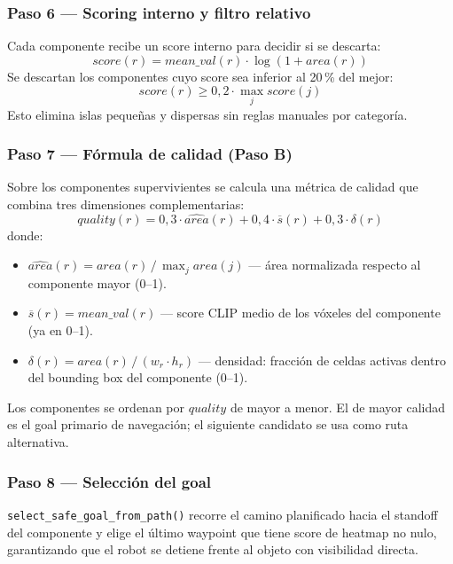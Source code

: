 \documentclass[11pt,a4paper]{article}
\begin{document}
\subsubsection*{Paso 6 — Scoring interno y filtro relativo}

Cada componente recibe un score interno para decidir si se descarta:
\[
  \textit{score}(r) = \textit{mean\_val}(r) \cdot \log(1 + \textit{area}(r))
\]
Se descartan los componentes cuyo score sea inferior al 20\,\% del mejor:
\[
  \textit{score}(r) \geq 0{,}2 \cdot \max_j \textit{score}(j)
\]
Esto elimina islas pequeñas y dispersas sin reglas manuales por categoría.

\subsubsection*{Paso 7 — Fórmula de calidad (Paso B)}

Sobre los componentes supervivientes se calcula una métrica de calidad que combina
tres dimensiones complementarias:
\[
  \textit{quality}(r) = 0{,}3 \cdot \widehat{\textit{area}}(r)
                      + 0{,}4 \cdot \overline{s}(r)
                      + 0{,}3 \cdot \delta(r)
\]
donde:
\begin{itemize}
  \item $\widehat{\textit{area}}(r) = \textit{area}(r) \,/\, \max_j \textit{area}(j)$
        --- área normalizada respecto al componente mayor (0--1).
  \item $\overline{s}(r) = \textit{mean\_val}(r)$ --- score CLIP medio de los vóxeles
        del componente (ya en 0--1).
  \item $\delta(r) = \textit{area}(r) \,/\, (w_r \cdot h_r)$ --- densidad: fracción de
        celdas activas dentro del bounding box del componente (0--1).
\end{itemize}
Los componentes se ordenan por $\textit{quality}$ de mayor a menor. El de mayor calidad
es el goal primario de navegación; el siguiente candidato se usa como ruta alternativa.

\subsubsection*{Paso 8 — Selección del goal}

\texttt{select\_safe\_goal\_from\_path()} recorre el camino planificado hacia el
standoff del componente y elige el último waypoint que tiene score de heatmap no nulo,
garantizando que el robot se detiene frente al objeto con visibilidad directa.
\end{document}
